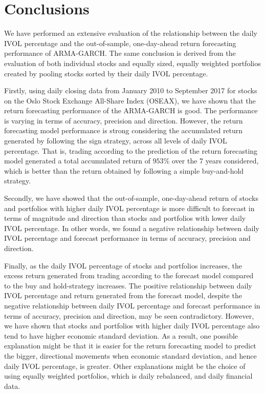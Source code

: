 
\chapter{Conclusions}
\label{Conclusions}

We have performed an extensive evaluation of the relationship between the daily IVOL percentage and the out-of-sample, one-day-ahead return forecasting performance of ARMA-GARCH. The same conclusion is derived from the evaluation of both individual stocks and equally sized, equally weighted portfolios created by pooling stocks sorted by their daily IVOL percentage. 

Firstly, using daily closing data from January 2010 to September 2017 for stocks on the Oslo Stock Exchange All-Share Index (OSEAX), we have shown that the return forecasting performance of the ARMA-GARCH is good. The performance is varying in terms of accuracy, precision and direction. However, the return forecasting model performance is strong considering the accumulated return generated by following the sign strategy, across all levels of daily IVOL percentage. That is, trading according to the prediction of the return forecasting model generated a total accumulated return of $953\%$ over the 7 years considered, which is better than the return obtained by following a simple buy-and-hold strategy.

Secondly, we have showed that the out-of-sample, one-day-ahead return of stocks and portfolios with higher daily IVOL percentage is more difficult to forecast in terms of magnitude and direction than stocks and portfolios with lower daily IVOL percentage. In other words, we found a negative relationship between daily IVOL percentage and forecast performance in terms of accuracy, precision and direction.

Finally, as the  daily IVOL percentage of stocks and portfolios increases, the excess return generated from trading according to the forecast model compared to the buy and hold-strategy increases. The positive relationship between daily IVOL percentage and return generated from the forecast model, despite the negative relationship between daily IVOL percentage and forecast performance in terms of accuracy, precision and direction, may be seen contradictory. However, we have shown that stocks and portfolios with higher daily IVOL percentage also tend to have higher economic standard deviation. As a result, one possible explanation might be that it is easier for the return forecasting model to predict the bigger, directional movements when economic standard deviation, and hence daily IVOL percentage, is greater. Other explanations might be the choice of using equally weighted portfolios, which is daily rebalanced, and daily financial data.